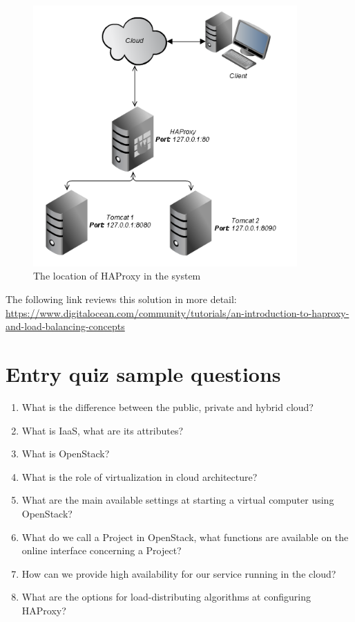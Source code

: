\documentclass[a4paper]{article}
\begin{document}
\begin{figure}[H]
    \centering
    \includegraphics[width=0.9\textwidth]{figures/haproxy.png}
    \caption{The location of HAProxy in the system}
    \label{fig:haproxy}
\end{figure}

The following link reviews this solution in more detail:
\url{https://www.digitalocean.com/community/tutorials/an-introduction-to-haproxy-and-load-balancing-concepts}

\appendix

\section{Entry quiz sample questions}

\begin{enumerate}
    \item What is the difference between the public, private and hybrid cloud?
    \item What is IaaS, what are its attributes?
    \item What is OpenStack?
    \item What is the role of virtualization in cloud architecture?
    \item What are the main available settings at starting a virtual computer using OpenStack?
    \item What do we call a Project in OpenStack, what functions are available on the online interface concerning a
          Project?
    \item How can we provide high availability for our service running in the cloud?
    \item What are the options for load-distributing algorithms at configuring HAProxy?
\end{enumerate}
\end{document}
